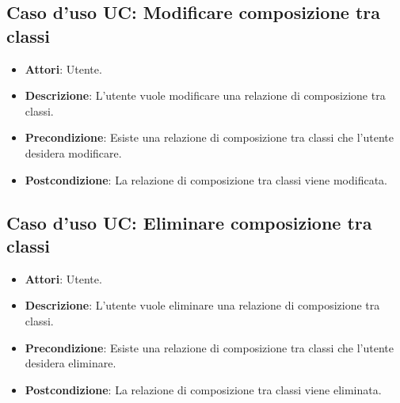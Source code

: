 \documentclass[../AnalisiDeiRequisiti.tex]{subfiles}
\begin{document}
		\subsection{Caso d'uso UC:  Modificare composizione tra classi}
		\begin{itemize}
			\item\textbf{Attori}: Utente.
			\item\textbf{Descrizione}: L'utente vuole modificare una relazione di composizione tra classi.
			\item\textbf{Precondizione}: Esiste una relazione di composizione tra classi che l'utente desidera modificare.
			\item\textbf{Postcondizione}: La relazione di composizione tra classi viene modificata.
		\end{itemize}
		
		\subsection{Caso d'uso UC: Eliminare composizione tra classi}
		\begin{itemize}
			\item\textbf{Attori}: Utente.
			\item\textbf{Descrizione}: L'utente vuole eliminare una relazione di composizione tra classi.
			\item\textbf{Precondizione}: Esiste una relazione di composizione tra classi che l'utente desidera eliminare.
			\item\textbf{Postcondizione}: La relazione di composizione tra classi viene eliminata.
		\end{itemize}
		
\end{document}
